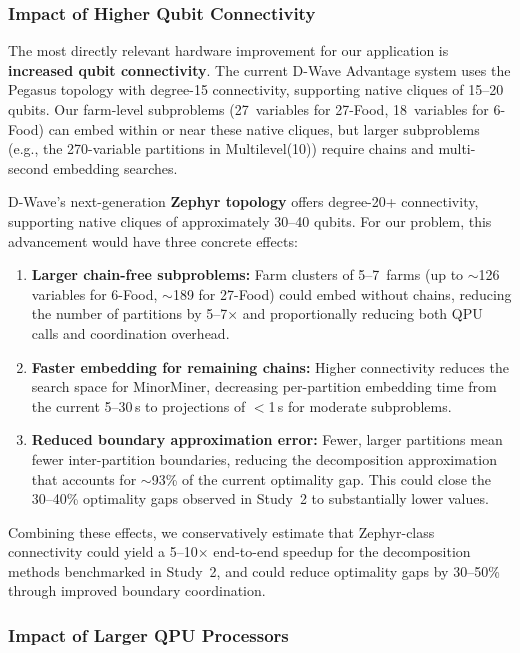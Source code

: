 \subsubsection{Impact of Higher Qubit Connectivity}

The most directly relevant hardware improvement for our application is \textbf{increased qubit connectivity}. The current D-Wave Advantage system uses the Pegasus topology with degree-15 connectivity, supporting native cliques of 15--20 qubits. Our farm-level subproblems (27~variables for 27-Food, 18~variables for 6-Food) can embed within or near these native cliques, but larger subproblems (e.g., the 270-variable partitions in Multilevel(10)) require chains and multi-second embedding searches.

D-Wave's next-generation \textbf{Zephyr topology} offers degree-20+ connectivity, supporting native cliques of approximately 30--40 qubits. For our problem, this advancement would have three concrete effects:

\begin{enumerate}
    \item \textbf{Larger chain-free subproblems:} Farm clusters of 5--7~farms (up to $\sim$126 variables for 6-Food, $\sim$189 for 27-Food) could embed without chains, reducing the number of partitions by 5--7$\times$ and proportionally reducing both QPU calls and coordination overhead.
    
    \item \textbf{Faster embedding for remaining chains:} Higher connectivity reduces the search space for MinorMiner, decreasing per-partition embedding time from the current 5--30\,s to projections of $<$1\,s for moderate subproblems.
    
    \item \textbf{Reduced boundary approximation error:} Fewer, larger partitions mean fewer inter-partition boundaries, reducing the decomposition approximation that accounts for $\sim$93\% of the current optimality gap. This could close the 30--40\% optimality gaps observed in Study~2 to substantially lower values.
\end{enumerate}

Combining these effects, we conservatively estimate that Zephyr-class connectivity could yield a 5--10$\times$ end-to-end speedup for the decomposition methods benchmarked in Study~2, and could reduce optimality gaps by 30--50\% through improved boundary coordination.

\subsubsection{Impact of Larger QPU Processors}

